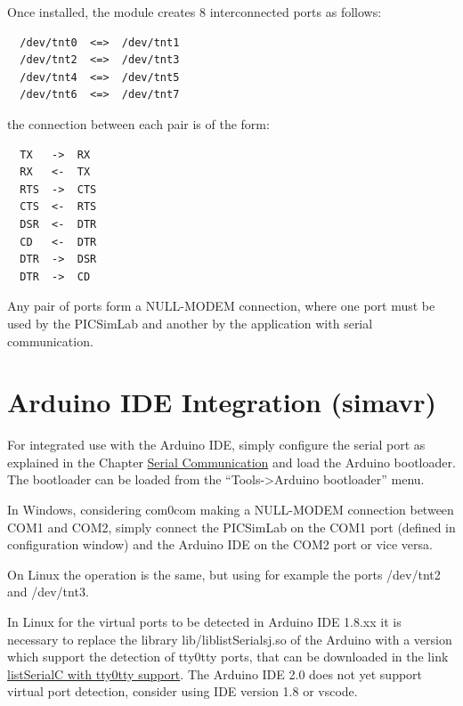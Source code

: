 Once installed, the module creates 8 interconnected ports as follows:
\begin{verbatim}
  /dev/tnt0  <=>  /dev/tnt1 
  /dev/tnt2  <=>  /dev/tnt3 
  /dev/tnt4  <=>  /dev/tnt5 
  /dev/tnt6  <=>  /dev/tnt7 
\end{verbatim}

the connection between each pair is of the form:
\begin{verbatim}  
  TX   ->  RX
  RX   <-  TX 	
  RTS  ->  CTS
  CTS  <-  RTS
  DSR  <-  DTR
  CD   <-  DTR
  DTR  ->  DSR
  DTR  ->  CD
\end{verbatim}

Any pair of ports form a NULL-MODEM connection, where one port must be used by the PICSimLab and another by the application with serial communication.


\section{Arduino IDE Integration (simavr) } \hypertarget{def:arduinoide}{}

For integrated use with the Arduino IDE, simply configure the serial port as explained in the Chapter \hyperlink{def:seriali}{Serial Communication} and load the Arduino bootloader. The bootloader can be loaded from the ``Tools->Arduino bootloader'' menu.

In Windows, considering com0com making a NULL-MODEM connection between COM1 and COM2, simply connect the PICSimLab on the COM1 port (defined in configuration window) and the Arduino IDE on the COM2 port or vice versa.

On Linux the operation is the same, but using for example the ports /dev/tnt2 and /dev/tnt3.

In Linux for the virtual ports to be detected in Arduino IDE 1.8.xx it is necessary to replace the library lib/liblistSerialsj.so of the Arduino with a version which support the detection of tty0tty ports, that can be downloaded in the link \href{https://github.com/lcgamboa/listSerialPortsC/releases} {listSerialC with tty0tty support}. The Arduino IDE 2.0 does not yet support virtual port detection, consider using IDE version 1.8 or vscode.

